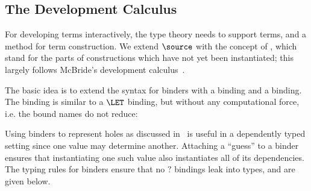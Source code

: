 
\subsection{The Development Calculus}

\label{sec:devcalc}

For developing terms interactively, the type theory needs to support
 terms, and a method for term construction. We
extend $\source$ with the concept of , which stand for
the parts of constructions which have not yet been instantiated; this
largely follows McBride's \Oleg{} development
calculus~\cite{mcbride-thesis}.

The basic idea is to extend the syntax for binders with a 
binding and a  binding. The  binding is
similar to a $\LET$ binding, but without any computational force,
i.e. the bound names do not reduce:


Using binders to represent holes as discussed in~\cite{mcbride-thesis}
is useful in a dependently typed setting since one value may determine
another. Attaching a ``guess'' to a binder ensures that instantiating one
such value also instantiates all of its dependencies. The typing rules for
binders ensure that no $?$ bindings leak into types, and are given
below.



